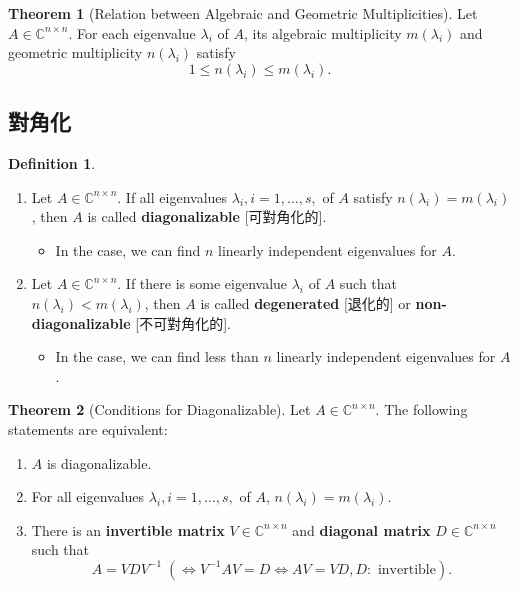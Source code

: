 \documentclass{article}
\theoremstyle{definition}
\newtheorem{definition}{Definition}[section]
\newtheorem{theorem}{Theorem}[section]
\numberwithin{theorem}{section}
\numberwithin{equation}{section}
\begin{document}
\begin{theorem}[Relation between Algebraic and Geometric Multiplicities]
    Let $A \in \mathbb{C}^{n \times n}$. For each eigenvalue $\lambda_i$ of $A$, its algebraic multiplicity $m(\lambda_i)$ and geometric multiplicity $n(\lambda_i)$ satisfy
\[
1 \leq n(\lambda_i) \leq m(\lambda_i).
\]
\end{theorem}

\subsection{對角化}

\begin{definition}
    \begin{enumerate}
\item Let $A \in \mathbb{C}^{n \times n}$. If all eigenvalues $\lambda_i, i=1,\ldots,s,$ of $A$ satisfy $n(\lambda_i) = m(\lambda_i)$, then $A$ is called \textbf{diagonalizable} [可對角化的].
  \begin{itemize}
  \item In the case, we can find $n$ linearly independent eigenvalues for $A$.
  \end{itemize}
\item Let $A \in \mathbb{C}^{n \times n}$. If there is some eigenvalue $\lambda_i$ of $A$ such that $n(\lambda_i) < m(\lambda_i)$, then $A$ is called \textbf{degenerated} [退化的] or  \textbf{non-diagonalizable} [不可對角化的].
  \begin{itemize}
  \item    In the case, we can find less than $n$ linearly independent eigenvalues for $A$.  
  \end{itemize}
\end{enumerate}
\end{definition}


\begin{theorem}[Conditions for Diagonalizable]
    Let $A \in \mathbb{C}^{n \times n}$. The following statements are equivalent:
\begin{enumerate}
\item $A$ is diagonalizable.
\item For all eigenvalues $\lambda_i, i=1,\ldots,s,$ of $A$, $n(\lambda_i) = m(\lambda_i)$.
\item There is an \textbf{invertible matrix} $V\in \mathbb{C}^{n \times n}$ and \textbf{diagonal matrix} $D\in \mathbb{C}^{n \times n}$ such that
  \[
   A = VDV^{-1} \; (\Longleftrightarrow V^{-1}AV = D
   \Longleftrightarrow AV= VD, D:\text{ invertible}).
   \]
\end{enumerate}
\end{theorem}
\end{document}
